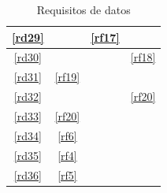 \documentclass[12pt,a4paper]{article}
\begin{document}
\begin{table}[H]
\begin{center}
\begin{tabular}{|c|c|c|c|}
\hline
	\ref{rd29} &  & \ref{rf17} & \\
\hline
	\ref{rd30} &  &  & \ref{rf18} \\
\hline
	\ref{rd31} & \ref{rf19} &  & \\
\hline
	\ref{rd32} &  &  & \ref{rf20} \\
\hline
	\ref{rd33} & \ref{rf20} &  & \\
\hline
	\ref{rd34} & \ref{rf6} &  & \\
\hline
	\ref{rd35} & \ref{rf4} &  & \\
\hline
	\ref{rd36} & \ref{rf5} &  & \\
\hline
\end{tabular}
\end{center}
\caption{Requisitos de datos}
\end{table}
\end{document}
